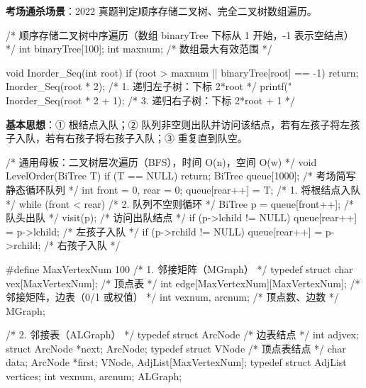 \documentclass[10pt,a4paper]{ctexart}
\begin{document}
\textbf{考场通杀场景}：2022 真题判定顺序存储二叉树、完全二叉树数组遍历。

\begin{codebox}
/* 顺序存储二叉树中序遍历（数组 binaryTree 下标从 1 开始，-1 表示空结点） */
int binaryTree[100];
int maxnum;                             /* 数组最大有效范围 */

void Inorder_Seq(int root) {
    if (root > maxnum || binaryTree[root] == -1) return;
    Inorder_Seq(root * 2);              /* 1. 递归左子树：下标 2*root */
    printf("%
    Inorder_Seq(root * 2 + 1);          /* 3. 递归右子树：下标 2*root + 1 */
}
\end{codebox}

\par\addvspace{3pt}\par\addvspace{3pt}


\textbf{基本思想}：① 根结点入队；② 队列非空则出队并访问该结点，若有左孩子将左孩子入队，若有右孩子将右孩子入队；③ 重复直到队空。

\begin{codebox}
/* 通用母板：二叉树层次遍历（BFS），时间 O(n)，空间 O(w) */
void LevelOrder(BiTree T) {
    if (T == NULL) return;
    BiTree queue[1000];                 /* 考场简写静态循环队列 */
    int front = 0, rear = 0;
    queue[rear++] = T;                  /* 1. 将根结点入队 */
    while (front < rear) {              /* 2. 队列不空则循环 */
        BiTree p = queue[front++];      /* 队头出队 */
        visit(p);                       /* 访问出队结点 */
        if (p->lchild != NULL) queue[rear++] = p->lchild;  /* 左孩子入队 */
        if (p->rchild != NULL) queue[rear++] = p->rchild;  /* 右孩子入队 */
    }
}
\end{codebox}

\par\addvspace{3pt}\par\addvspace{3pt}


\begin{codebox}
#define MaxVertexNum 100
/* 1. 邻接矩阵（MGraph） */
typedef struct {
    char vex[MaxVertexNum];                         /* 顶点表 */
    int edge[MaxVertexNum][MaxVertexNum];           /* 邻接矩阵，边表（0/1 或权值） */
    int vexnum, arcnum;                             /* 顶点数、边数 */
} MGraph;

/* 2. 邻接表（ALGraph） */
typedef struct ArcNode {                            /* 边表结点 */
    int adjvex; struct ArcNode *next;
} ArcNode;
typedef struct VNode {                              /* 顶点表结点 */
    char data; ArcNode *first;
} VNode, AdjList[MaxVertexNum];
typedef struct { AdjList vertices; int vexnum, arcnum; } ALGraph;
\end{codebox}
\end{document}
